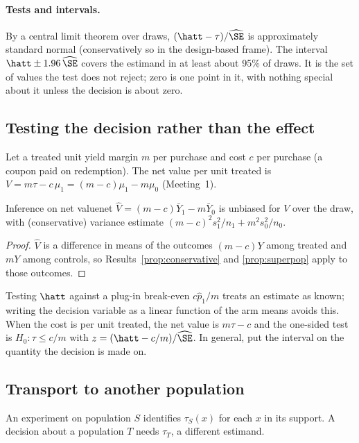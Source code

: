 \documentclass[11pt]{article}
\begin{document}
\paragraph{Tests and intervals.} By a central limit theorem over draws, $(\hatt - \tau)/\widehat\SE$ is
approximately standard normal (conservatively so in the design-based frame). The interval
$\hatt \pm 1.96\,\widehat\SE$ covers the estimand in at least about 95\% of draws. It is the set of values the
test does not reject; zero is one point in it, with nothing special about it unless the decision is about
zero.

\subsection{Testing the decision rather than the effect}

Let a treated unit yield margin $m$ per purchase and cost $c$ per purchase (a coupon paid on redemption).
The net value per unit treated is $V = m\tau - c\,\mu_1 = (m-c)\mu_1 - m\mu_0$ (Meeting~1).

\begin{prop}{Inference on net value}{net}
$\hat V = (m-c)\bar Y_1 - m\bar Y_0$ is unbiased for $V$ over the draw, with (conservative) variance
estimate $(m-c)^2 s_1^2/n_1 + m^2 s_0^2/n_0$.
\end{prop}
\begin{proof}
$\hat V$ is a difference in means of the outcomes $(m-c)Y$ among treated and $mY$ among controls, so
Results~\ref{prop:conservative} and \ref{prop:superpop} apply to those outcomes.
\end{proof}

Testing $\hatt$ against a plug-in break-even $c\hat p_1/m$ treats an estimate as known; writing the decision
variable as a linear function of the arm means avoids this. When the cost is per unit treated, the net value
is $m\tau - c$ and the one-sided test is $H_0: \tau \le c/m$ with $z = (\hatt - c/m)/\widehat\SE$. In general,
put the interval on the quantity the decision is made on.

\subsection{Transport to another population}

An experiment on population $S$ identifies $\tau_S(x)$ for each $x$ in its support. A decision about a
population $T$ needs $\tau_T$, a different estimand.
\end{document}
